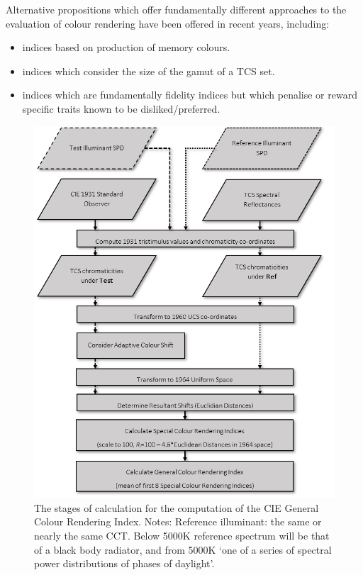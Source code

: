 Alternative propositions which offer fundamentally different approaches to the evaluation of colour rendering have been offered in recent years, including: 
\begin{itemize}
\item indices based on production of memory colours\citep{smet_memory_2012}.
\item indices which consider the size of the gamut of a TCS set\citep{rea_color_2008,teunissen_characterising_2016}.
\item indices which are fundamentally fidelity indices but which penalise or reward specific traits known to be disliked/preferred\citep{ohno_rationale_2010}.
\end{itemize}

\begin{figure}[htbp]
\includegraphics[max width=\textwidth]{figs/LitRev/criflow.png}
\caption{The stages of calculation for the computation of the CIE General Colour Rendering Index. Notes: Reference illuminant: the same or nearly the same CCT. Below 5000K reference spectrum will be that of a black body radiator, and from 5000K `one of a series of spectral power distributions of phases of daylight'.}
\label{fig:criflow}
\end{figure}


